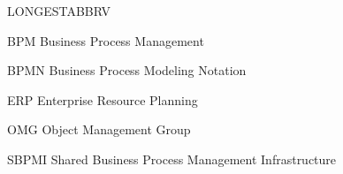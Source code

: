 \begin{theglossary}{LONGESTABBRV}
\item[BPM] Business Process Management
\item[BPMN] Business Process Modeling Notation
\item[ERP] Enterprise Resource Planning
\item[OMG] Object Management Group
\item[SBPMI] Shared Business Process Management Infrastructure
\end{theglossary}
